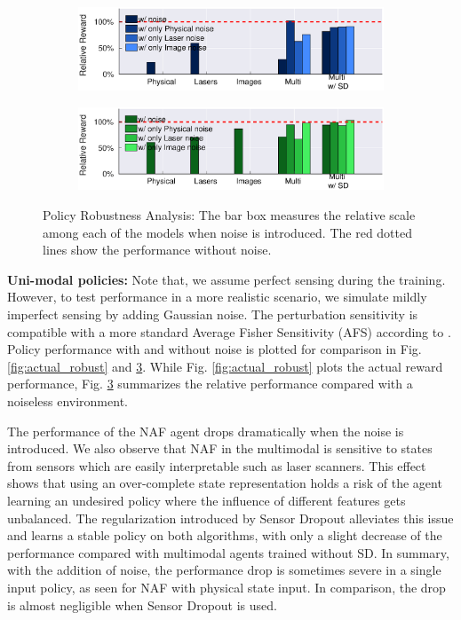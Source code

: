 \documentclass[../thesis.tex]{subfiles}
\begin{document}
\begin{figure}[t]
    \centering
    \begin{subfigure}[b]{0.48\linewidth}
        \includegraphics[width=\columnwidth,trim= 45 180 45 25, clip=true]{./MultimodalDRL/fig/relative_robust_naf}
        \label{fig:relative_robust_naf}
    \end{subfigure}
    \begin{subfigure}[b]{0.48\linewidth}
        \includegraphics[width=\columnwidth,trim= 45 180 45 25, clip=true]{./MultimodalDRL/fig/relative_robust_ddpg}
        \label{fig:relative_robust_ddpg}
    \end{subfigure}
    \caption{Policy Robustness Analysis: The bar box measures the relative scale among each of the models when noise is introduced. The red dotted lines show the performance without noise.}
    \label{fig:relative_robust}
\end{figure}
 
\textbf{Uni-modal policies:}
Note that, we assume perfect sensing during the training. However, to test performance in a more realistic scenario, we simulate mildly imperfect sensing by adding Gaussian noise. The perturbation sensitivity is compatible with a more standard Average Fisher Sensitivity (AFS) according to \cite{progressive_net}. Policy performance with and without noise is plotted for comparison in Fig. \ref{fig:actual_robust} and \ref{fig:relative_robust}. While Fig. \ref{fig:actual_robust} plots the actual reward performance, Fig. \ref{fig:relative_robust} summarizes the relative performance compared with a noiseless environment.
 
The performance of the NAF agent drops dramatically when the noise is introduced. We also observe that NAF in the multimodal is sensitive to states from sensors which are easily interpretable such as laser scanners. This effect shows that using an over-complete state representation holds a risk of the agent learning an undesired policy where the influence of different features gets unbalanced. The regularization introduced by Sensor Dropout alleviates this issue and learns a stable policy on both algorithms, with only a slight decrease of the performance compared with multimodal agents trained without SD. In summary, with the addition of noise, the performance drop is sometimes severe in a single input policy, as seen for NAF with physical state input. In comparison, the drop is almost negligible when Sensor Dropout is used.
 
\end{document}
